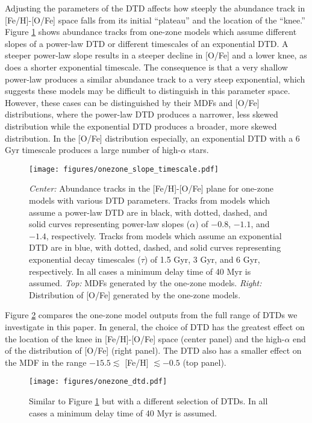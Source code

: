 \documentclass[twocolumn,linenumbers,twocolappendix]{aastex631}
\begin{document}
Adjusting the parameters of the DTD affects how steeply the abundance track in [Fe/H]-[O/Fe] space falls from its initial ``plateau'' and the location of the ``knee.'' Figure \ref{fig:onezone-slope-timescale} shows abundance tracks from one-zone models which assume different slopes of a power-law DTD or different timescales of an exponential DTD. A steeper power-law slope results in a steeper decline in [O/Fe] and a lower knee, as does a shorter exponential timescale. The consequence is that a very shallow power-law produces a similar abundance track to a very steep exponential, which suggests these models may be difficult to distinguish in this parameter space. However, these cases can be distinguished by their MDFs and [O/Fe] distributions, where the power-law DTD produces a narrower, less skewed distribution while the exponential DTD produces a broader, more skewed distribution. In the [O/Fe] distribution especially, an exponential DTD with a 6 Gyr timescale produces a large number of high-$\alpha$ stars.

\begin{figure}
    \centering
    \texttt{[image: figures/onezone\_slope\_timescale.pdf]}
    \caption{\textit{Center:} Abundance tracks in the [Fe/H]-[O/Fe] plane for one-zone models with various DTD parameters. Tracks from models which assume a power-law DTD are in black, with dotted, dashed, and solid curves representing power-law slopes ($\alpha$) of $-0.8$, $-1.1$, and $-1.4$, respectively. Tracks from models which assume an exponential DTD are in blue, with dotted, dashed, and solid curves representing exponential decay timescales ($\tau$) of 1.5 Gyr, 3 Gyr, and 6 Gyr, respectively. In all cases a minimum delay time of 40 Myr is assumed. \textit{Top:} MDFs generated by the one-zone models. \textit{Right:} Distribution of [O/Fe] generated by the one-zone models.}
    \label{fig:onezone-slope-timescale}
\end{figure}

Figure \ref{fig:onezone-dtd} compares the one-zone model outputs from the full range of DTDs we investigate in this paper. In general, the choice of DTD has the greatest effect on the location of the knee in [Fe/H]-[O/Fe] space (center panel) and the high-$\alpha$ end of the distribution of [O/Fe] (right panel). The DTD also has a smaller effect on the MDF in the range $-15.5\lesssim$ [Fe/H] $\lesssim-0.5$ (top panel).

\begin{figure}
    \centering
    \texttt{[image: figures/onezone\_dtd.pdf]}
    \caption{Similar to Figure \ref{fig:onezone-slope-timescale} but with a different selection of DTDs. In all cases a minimum delay time of 40 Myr is assumed.}
    \label{fig:onezone-dtd}
\end{figure}
\end{document}
